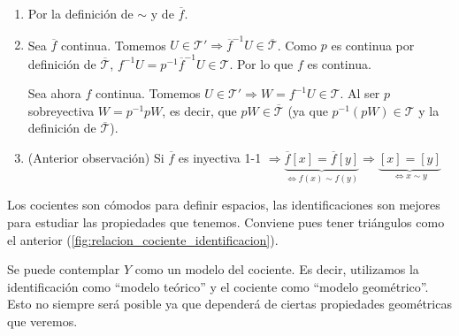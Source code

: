 \begin{demo}
\begin{enumerate}
    \item Por la definición de $\sim$ y de $\overline{f}$.
    \item Sea $\overline{f}$ continua. Tomemos $U \in \mathcal{T}' \Rightarrow \overline{f}^{-1}U \in \overline{\mathcal{T}}$. Como $p$ es continua por definición de $\overline{\mathcal{T}}$, $f^{-1} U = p^{-1} \overline{f}^{-1} U \in \mathcal{T}$. Por lo que $f$ es continua.

    Sea ahora $f$ continua. Tomemos $U \in \mathcal{T}' \Rightarrow W = f^{-1}U \in \mathcal{T}$. Al ser $p$ sobreyectiva $W = p^{-1}pW$, es decir, que $pW \in \overline{\mathcal{T}}$ (ya que $p^{-1}\left( p W \right) \in \mathcal{T}$ y la definición de $\overline{\mathcal{T}}$).

    \item (Anterior observación) Si $\overline{f}$ es inyectiva 1-1 $\Rightarrow \underbrace{\overline{f}\left[ x \right] = \overline{f}\left[ y \right]}_{\Leftrightarrow f\left( x \right) \sim f\left( y \right)} \Rightarrow \underbrace{\left[ x \right] = \left[ y \right]}_{\Leftrightarrow x \sim y}$
\end{enumerate}
\end{demo}

\begin{pg}
    Los cocientes son cómodos para definir espacios, las identificaciones son mejores para estudiar las propiedades que tenemos. Conviene pues tener triángulos como el anterior (\ref{fig:relacion_cociente_identificacion}). 

    Se puede contemplar $Y$ como un modelo del cociente. Es decir, utilizamos la identificación como ``modelo teórico'' y el cociente como ``modelo geométrico''. Esto no siempre será posible ya que dependerá de ciertas propiedades geométricas que veremos.
\end{pg}

